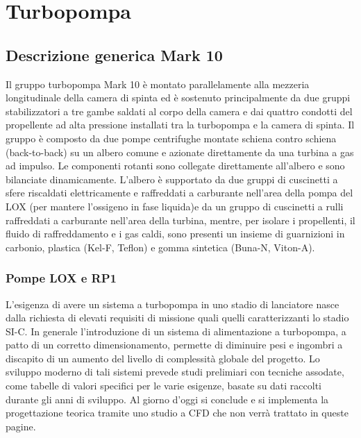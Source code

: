 \section{Turbopompa}
\label{sec:turbopompa}

\subsection{Descrizione generica Mark 10}
\label{subsec:descrizione mark 10}

Il gruppo turbopompa Mark 10 è montato parallelamente alla mezzeria longitudinale della camera di spinta ed è sostenuto principalmente da due gruppi stabilizzatori a tre gambe saldati al corpo della camera e dai quattro condotti del propellente ad alta pressione installati tra la turbopompa e la camera di spinta. 
Il gruppo è composto da due pompe centrifughe montate schiena contro schiena (back-to-back) su un albero comune e azionate direttamente da una turbina a gas ad impulso.
Le componenti rotanti sono collegate direttamente all'albero e sono bilanciate dinamicamente.
L'albero è supportato da due gruppi di cuscinetti a sfere riscaldati elettricamente e raffreddati a carburante nell'area della pompa del LOX (per mantere l'ossigeno in fase liquida)e da un gruppo di cuscinetti a rulli raffreddati a carburante nell'area della turbina, mentre, per isolare i propellenti, il fluido di raffreddamento e i gas caldi, sono presenti un insieme di guarnizioni in carbonio, plastica (Kel-F, Teflon) e gomma sintetica (Buna-N, Viton-A).

\subsubsection{Pompe LOX e RP1}

L'esigenza di avere un sistema a turbopompa in uno stadio di lanciatore nasce dalla richiesta di elevati requisiti di missione quali quelli caratterizzanti lo stadio SI-C. In generale l'introduzione di un sistema di alimentazione a turbopompa, a patto di un corretto dimensionamento, permette di diminuire pesi e ingombri a discapito di un aumento del livello di complessità globale del progetto. Lo sviluppo moderno di tali sistemi prevede studi prelimiari con tecniche assodate, come tabelle di valori specifici per le varie esigenze, basate su dati raccolti durante gli anni di sviluppo. Al giorno d'oggi si conclude e si implementa la progettazione teorica tramite uno studio a CFD che non verrà trattato in queste pagine. 

